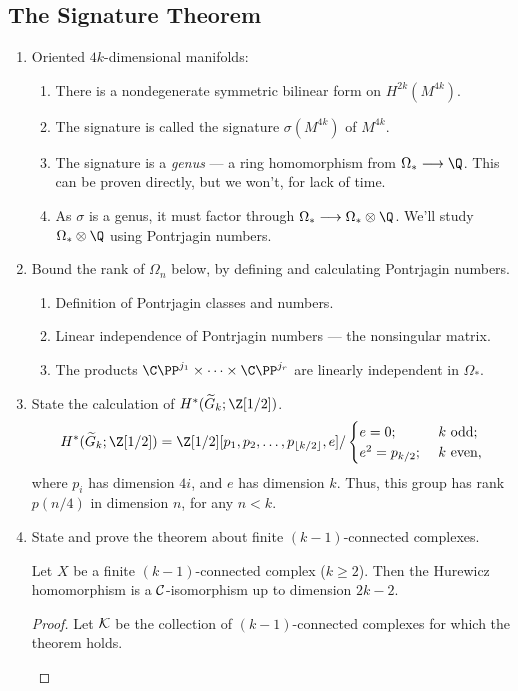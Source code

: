 \documentclass[11pt]{article}
\newcommand{\KanSemResponse}[1]
{
\thispagestyle{fancy}
\subsection*{#1}
}
\begin{document}
\begin{SignatureThmTalk}
\KanSemResponse
{The Signature Theorem}
\begin{enumerate}
\item Oriented $4k$-dimensional manifolds:
\begin{enumerate}
\item There is a nondegenerate symmetric bilinear form on $H^{2k}(M^{4k})$.
\item The signature is called the signature $\sigma(M^{4k})$ of $M^{4k}$. 
\item The signature is a \emph{genus} --- a ring homomorphism from $\Omega_*\to\Q$. This can be proven directly, but we won't, for lack of time.
\item As $\sigma$ is a genus, it must factor through $\Omega_*\to\Omega_*\otimes\Q$. We'll study $\Omega_*\otimes \Q$ using Pontrjagin numbers.
\end{enumerate}
\item Bound the rank of $\Omega_n$ below, by defining and calculating Pontrjagin numbers.
\begin{enumerate}
\item Definition of Pontrjagin classes and numbers.
\item Linear independence of Pontrjagin numbers --- the nonsingular matrix. 
\item The products $\CP^{j_1}\times\cdots\times\CP^{j_r}$ are linearly independent in $\Omega_*$.
\end{enumerate}
\item State the calculation of $H^*(\widetilde G_{k};\Z[1/2])$.
\[H^*(\widetilde G_{k};\Z[1/2])=\Z[1/2][p_1,p_2,\ldots,p_{\lfloor k/2\rfloor},e]/
\begin{cases}
e=0;&\ \text{$k$ odd};\\
e^2=p_{k/2};&\ \text{$k$ even},
\end{cases}\]
where $p_i$ has dimension $4i$, and $e$ has dimension $k$. Thus, this group has rank $p(n/4)$ in dimension $n$, for any $n<k$.
\item State and prove the theorem about finite $(k-1)$-connected complexes.
\begin{thm*}[18.3]
Let $X$ be a finite $(k-1)$-connected complex ($k\geq2$). Then the Hurewicz homomorphism is a $\mathcal{C}$-isomorphism up to dimension $2k-2$.
\end{thm*}
\begin{proof}Let $\mathcal{K}$ be the collection of $(k-1)$-connected complexes for which the theorem holds.
\begin{itemise}

\end{itemise}
\end{proof}
\end{enumerate}
\end{SignatureThmTalk}
\end{document}
